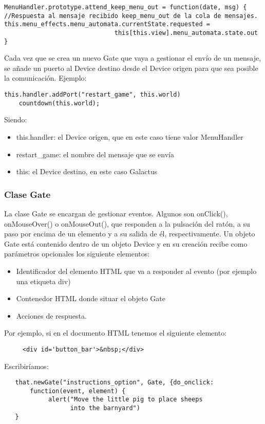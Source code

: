 \begin{verbatim}
MenuHandler.prototype.attend_keep_menu_out = function(date, msg) {
//Respuesta al mensaje recibido keep_menu_out de la cola de mensajes.
this.menu_effects.menu_automata.currentState.requested = 
                              this[this.view].menu_automata.state.out
}
\end{verbatim}

Cada vez que se crea un nuevo Gate que vaya a gestionar el envío de un mensaje, se añade un puerto al Device destino desde 
el Device origen para que sea posible la comunicación. Ejemplo:

\begin{verbatim}
this.handler.addPort("restart_game", this.world)
    countdown(this.world);
\end{verbatim}

Siendo:
\begin{itemize}
 \item this.handler: el Device origen, que en este caso tiene valor MenuHandler
 \item restart\_game: el nombre del mensaje que se envía
 \item this: el Device destino, en este caso Galactus
\end{itemize}


\subsubsection{Clase Gate}
\label{subsubsection:gate}
 
La clase Gate se encargan de gestionar eventos. Algunos son onClick(), onMouseOver() o onMouseOut(), que responden a la pulsación del ratón, a 
su paso por encima de un elemento y a su salida de él, respectivamente. 
Un objeto Gate está contenido dentro de un objeto Device y en su creación recibe como parámetros opcionales los siguiente elementos:

\begin{itemize}
 \item Identificador del elemento HTML que va a responder al evento (por ejemplo una etiqueta div) 
 \item Contenedor HTML donde situar el objeto Gate
 \item Acciones de respuesta.
\end{itemize}

Por ejemplo, si en el documento HTML tenemos el siguiente elemento:
\begin{verbatim}
     <div id='button_bar'>&nbsp;</div>
\end{verbatim}
Escribiríamos:
\begin{verbatim}
   that.newGate("instructions_option", Gate, {do_onclick: 
       function(event, element) {
            alert("Move the little pig to place sheeps 
                  into the barnyard")
   }
\end{verbatim}

